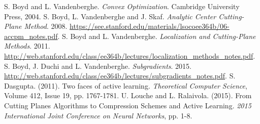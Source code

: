 \documentclass[11pt]{amsart}
\theoremstyle{definition}
\theoremstyle{remark}
\begin{document}
\renewcommand\refname{Bibliography}
\begin{thebibliography}{99}
     S. Boyd and L. Vandenberghe. \emph{Convex Optimization}. Cambridge University Press, 2004.
     S. Boyd, L. Vandenberghe and J. Skaf. \emph{Analytic Center Cutting-Plane Method}. 2008. \url{https://see.stanford.edu/materials/lsocoee364b/06-accpm_notes.pdf}.
     S. Boyd and L. Vandenberghe. \emph{Localization and Cutting-Plane Methods}. 2011. \url{http://web.stanford.edu/class/ee364b/lectures/localization_methods_notes.pdf}.
     S. Boyd, J. Duchi and L. Vandenberghe. \emph{Subgradients}. 2015. \url{http://web.stanford.edu/class/ee364b/lectures/subgradients_notes.pdf}.
     S. Dasgupta. (2011). Two faces of active learning. \emph{Theoretical Computer Science}, Volume 412, Issue 19, pp. 1767-1781.
     U. Louche and L. Ralaivola. (2015). From Cutting Planes Algorithms to Compression Schemes and Active Learning. \emph{2015 International Joint Conference on Neural Networks}, pp. 1-8.  
\end{thebibliography}




\end{document}
